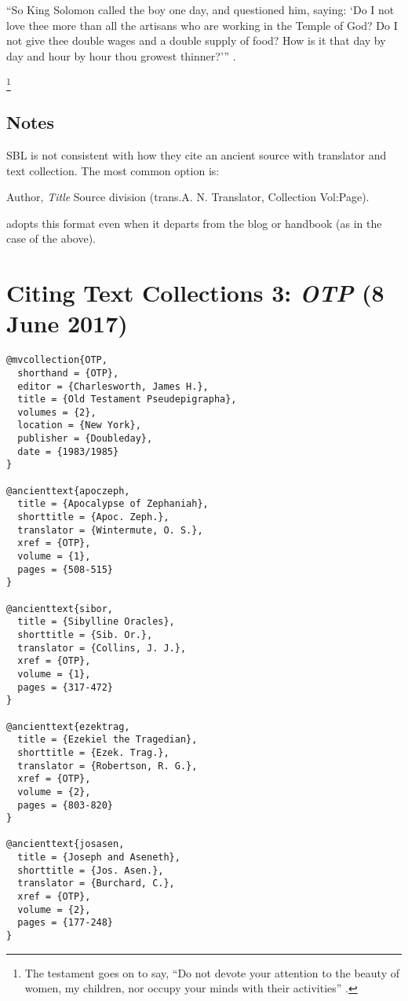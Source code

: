 \documentclass[a4paper]{article}
\begin{document}
\begin{verbcite}
  “So King Solomon called the boy one day, and questioned him, saying: ‘Do I
  not love thee more than all the artisans who are working in the Temple of
  God? Do I not give thee double wages and a double supply of food? How is it
  that day by day and hour by hour thou growest thinner?’”
  .
\end{verbcite}
\begin{fverbcite}{15}
  \footnote{The testament goes on to say, “Do not devote your attention to the
    beauty of women, my children, nor occupy your minds with their activities”
    .}
\end{fverbcite}
\exampleancientsources
\examplesecondarysources
\examplebibliography

\subsection{Notes}

SBL is not consistent with how they cite an ancient source with translator and
text collection. The most common option is:

Author, \emph{Title} Source division (trans.\@ A. N. Translator, Collection
Vol:Page).

 adopts this format even when it departs from the blog or
handbook (as in the case of the  above).


\section{Citing Text Collections 3: \emph{OTP} (8 June 2017)}

\begin{verbatim}
@mvcollection{OTP,
  shorthand = {OTP},
  editor = {Charlesworth, James H.},
  title = {Old Testament Pseudepigrapha},
  volumes = {2},
  location = {New York},
  publisher = {Doubleday},
  date = {1983/1985}
}

@ancienttext{apoczeph,
  title = {Apocalypse of Zephaniah},
  shorttitle = {Apoc. Zeph.},
  translator = {Wintermute, O. S.},
  xref = {OTP},
  volume = {1},
  pages = {508-515}
}

@ancienttext{sibor,
  title = {Sibylline Oracles},
  shorttitle = {Sib. Or.},
  translator = {Collins, J. J.},
  xref = {OTP},
  volume = {1},
  pages = {317-472}
}

@ancienttext{ezektrag,
  title = {Ezekiel the Tragedian},
  shorttitle = {Ezek. Trag.},
  translator = {Robertson, R. G.},
  xref = {OTP},
  volume = {2},
  pages = {803-820}
}

@ancienttext{josasen,
  title = {Joseph and Aseneth},
  shorttitle = {Jos. Asen.},
  translator = {Burchard, C.},
  xref = {OTP},
  volume = {2},
  pages = {177-248}
}
\end{verbatim}
\end{document}
